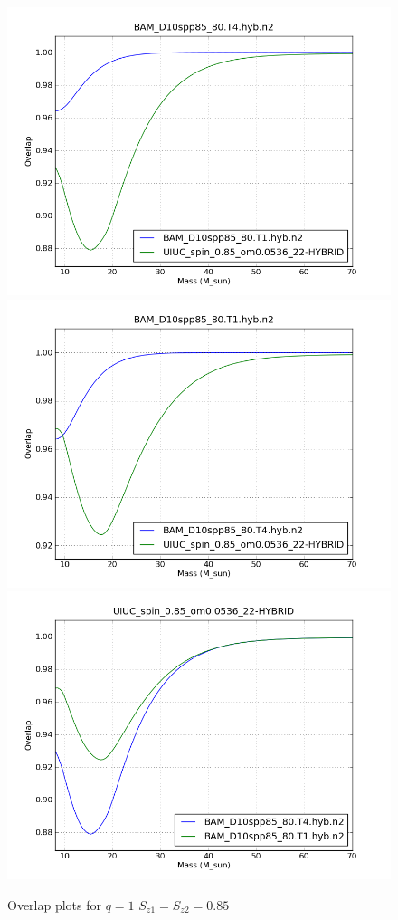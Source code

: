 \begin{figure}
  \includegraphics[width=0.5\linewidth]{figures/ninja2/figure_1_0d85_02.png} 
  \includegraphics[width=0.5\linewidth]{figures/ninja2/figure_1_0d85_04.png} \\
  \includegraphics[width=0.5\linewidth]{figures/ninja2/figure_1_0d85_06.png} 
  \caption[Overlap plots for $q=1$ $S_{z1} = S_{z2} = 0.85$]{
  \label{f:figure_1_0d85}
Overlap plots for $q=1$ $S_{z1} = S_{z2} = 0.85$}
\end{figure}%

\clearpage


